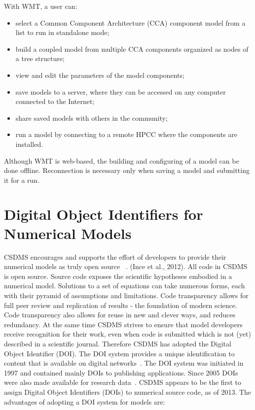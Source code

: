 \documentclass[11pt, oneside]{amsart}
\begin{document}
With WMT, a user can:

\begin{itemize}

\item select a Common Component Architecture (CCA) component model
      from a list to run in standalone mode;

\item build a coupled model from multiple CCA components organized as nodes
      of a tree structure;

\item  view and edit the parameters of the model components;

\item save models to a server, where they can be accessed on any computer
      connected to the Internet;

\item share saved models with others in the community;

\item run a model by connecting to a remote HPCC where the components are
      installed.

\end{itemize}

Although WMT is web-based, the building and configuring of a model can be done
offline. Reconnection is necessary only when saving a model and submitting it
for a run.

\section{Digital Object Identifiers for Numerical Models}

CSDMS encourages and supports
the effort of developers to provide their numerical models as truly open source
~\cite{ince2012case}.
(Ince et al., 2012). All code in CSDMS is open source. Source code exposes the
scientific hypotheses embodied in a numerical model. Solutions to a set of
equations can take numerous forms, each with their pyramid of assumptions and
limitations. Code transparency allows for full peer review and replication of
results - the foundation of modern science. Code transparency also allows for
reuse in new and clever ways, and reduces redundancy. At the same time CSDMS
strives to ensure that model developers receive recognition for their work, even
when code is submitted which is not (yet) described in a scientific journal.
Therefore CSDMS has adopted the Digital Object Identifier (DOI). The DOI system
provides a unique identification to content that is available on digital
networks~\cite{paskin2010}. The DOI system was initiated in 1997 and contained
mainly DOIs to publishing applications. Since 2005 DOIs were also made available
for research data~\cite{paskin2005digital}. CSDMS appears to be the first to
assign Digital Object Identifiers (DOIs) to numerical source code, as of 2013.
The advantages of adopting a DOI system for models are:
\end{document}
